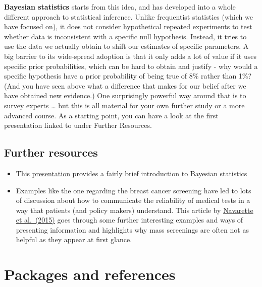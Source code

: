 \documentclass[
]{book}
\providecommand{\tightlist}{%
  \setlength{\itemsep}{0pt}\setlength{\parskip}{0pt}}
\begin{document}
\textbf{Bayesian statistics} starts from this idea, and has developed into a whole different approach to statistical inference. Unlike frequentist statistics (which we have focused on), it does not consider hypothetical repeated experiments to test whether data is inconsistent with a specific null hypothesis. Instead, it tries to use the data we actually obtain to shift our estimates of specific parameters. A big barrier to its wide-spread adoption is that it only adds a lot of value if it uses specific prior probabilities, which can be hard to obtain and justify - why would a specific hypothesis have a prior probability of being true of 8\% rather than 1\%? (And you have seen above what a difference that makes for our belief after we have obtained new evidence.) One surprisingly powerful way around that is to survey experts \ldots{} but this is all material for your own further study or a more advanced course. As a starting point, you can have a look at the first presentation linked to under Further Resources.

\hypertarget{further-resources-probability}{%
\section{Further resources}\label{further-resources-probability}}

\begin{itemize}
\tightlist
\item
  This \href{http://faculty.washington.edu/kenrice/BayesIntroClassEpi2018.pdf}{presentation} provides a fairly brief introduction to Bayesian statistics
\item
  Examples like the one regarding the breast cancer screening have led to lots of discussion about how to communicate the reliability of medical tests in a way that patients (and policy makers) understand. This article by \href{https://www.ncbi.nlm.nih.gov/pmc/articles/PMC4585185/}{Navarette et al.~(2015)} goes through some further interesting examples and ways of presenting information and highlights why mass screenings are often not as helpful as they appear at first glance.
\end{itemize}

\hypertarget{appendix-appendices}{%
\appendix}


\hypertarget{packages-and-references}{%
\chapter{Packages and references}\label{packages-and-references}}
\end{document}

